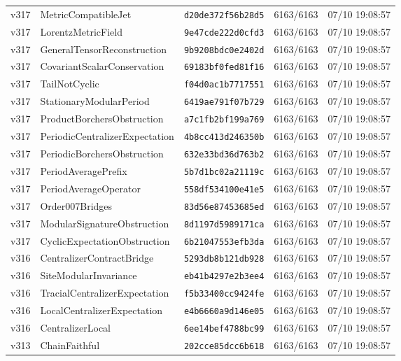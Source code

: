 \documentclass[11pt]{article}
\theoremstyle{definition}\newtheorem{deriv}{Derivation}
\begin{document}
{\begin{longtable}{@{}lllll@{}}
v317 & MetricCompatibleJet & \texttt{d20de372f56b28d5} & 6163/6163 & 07/10 19:08:57 \\
v317 & LorentzMetricField & \texttt{9e47cde222d0cfd3} & 6163/6163 & 07/10 19:08:57 \\
v317 & GeneralTensorReconstruction & \texttt{9b9208bdc0e2402d} & 6163/6163 & 07/10 19:08:57 \\
v317 & CovariantScalarConservation & \texttt{69183bf0fed81f16} & 6163/6163 & 07/10 19:08:57 \\
v317 & TailNotCyclic & \texttt{f04d0ac1b7717551} & 6163/6163 & 07/10 19:08:57 \\
v317 & StationaryModularPeriod & \texttt{6419ae791f07b729} & 6163/6163 & 07/10 19:08:57 \\
v317 & ProductBorchersObstruction & \texttt{a7c1fb2bf199a769} & 6163/6163 & 07/10 19:08:57 \\
v317 & PeriodicCentralizerExpectation & \texttt{4b8cc413d246350b} & 6163/6163 & 07/10 19:08:57 \\
v317 & PeriodicBorchersObstruction & \texttt{632e33bd36d763b2} & 6163/6163 & 07/10 19:08:57 \\
v317 & PeriodAveragePrefix & \texttt{5b7d1bc02a21119c} & 6163/6163 & 07/10 19:08:57 \\
v317 & PeriodAverageOperator & \texttt{558df534100e41e5} & 6163/6163 & 07/10 19:08:57 \\
v317 & Order007Bridges & \texttt{83d56e87453685ed} & 6163/6163 & 07/10 19:08:57 \\
v317 & ModularSignatureObstruction & \texttt{8d1197d5989171ca} & 6163/6163 & 07/10 19:08:57 \\
v317 & CyclicExpectationObstruction & \texttt{6b21047553efb3da} & 6163/6163 & 07/10 19:08:57 \\
v316 & CentralizerContractBridge & \texttt{5293db8b121db928} & 6163/6163 & 07/10 19:08:57 \\
v316 & SiteModularInvariance & \texttt{eb41b4297e2b3ee4} & 6163/6163 & 07/10 19:08:57 \\
v316 & TracialCentralizerExpectation & \texttt{f5b33400cc9424fe} & 6163/6163 & 07/10 19:08:57 \\
v316 & LocalCentralizerExpectation & \texttt{e4b6660a9d146e05} & 6163/6163 & 07/10 19:08:57 \\
v316 & CentralizerLocal & \texttt{6ee14bef4788bc99} & 6163/6163 & 07/10 19:08:57 \\
v313 & ChainFaithful & \texttt{202cce85dcc6b618} & 6163/6163 & 07/10 19:08:57 \\

\end{longtable}}
\end{document}
